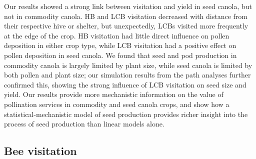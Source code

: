 \documentclass[12pt]{article} %
\begin{document}
Our results showed a strong link between visitation and yield in seed canola, but not in commodity canola.
HB and LCB visitation decreased with distance from their respective hive or shelter, but unexpectedly, LCBs visited more frequently at the edge of the crop.
HB visitation had little direct influence on pollen deposition in either crop type, while LCB visitation had a positive effect on pollen deposition in seed canola.
We found that seed and pod production in commodity canola is largely limited by plant size, while seed canola is limited by both pollen and plant size; our simulation results from the path analyses further confirmed this, showing the strong influence of LCB visitation on seed size and yield.
Our results provide more mechanistic information on the value of pollination services in commodity and seed canola crops, and show how a statistical-mechanistic model of seed production provides richer insight into the process of seed production than linear models alone.

\subsection*{Bee visitation} 
\end{document}
